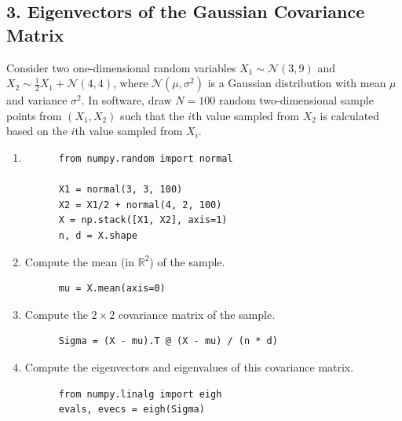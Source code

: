 \documentclass{article}
\renewcommand{\N}{\mathcal{N}}
\renewcommand{\R}{\mathbb{R}}
\begin{document}
\subsection*{3. Eigenvectors of the Gaussian Covariance Matrix}
Consider two one-dimensional random variables $X_1 \sim \N(3, 9)$ and $X_2 \sim \frac{1}{2}X_1 + \N(4, 4)$, where $\N(\mu, \sigma^2)$  is a Gaussian distribution with mean $\mu$ and variance $\sigma^2$. In software, draw $N = 100$ random two-dimensional sample points from $(X_1, X_2)$ such that the $i$th value sampled from $X_2$ is calculated based on the $i$th value sampled from $X_i$.
\begin{enumerate}[label=(\alph*)]
  \item
  \begin{mdframed}
    \begin{verbatim}
      from numpy.random import normal

      X1 = normal(3, 3, 100)
      X2 = X1/2 + normal(4, 2, 100)
      X = np.stack([X1, X2], axis=1)
      n, d = X.shape
    \end{verbatim}
  \end{mdframed}
\item Compute the mean (in $\R^2$) of the sample.
  \begin{mdframed}
    \begin{verbatim}
      mu = X.mean(axis=0)
    \end{verbatim}
  \end{mdframed}

\item Compute the $2 \times 2$ covariance matrix of the sample.
  \begin{mdframed}
    \begin{verbatim}
      Sigma = (X - mu).T @ (X - mu) / (n * d)
    \end{verbatim}
  \end{mdframed}

\item Compute the eigenvectors and eigenvalues of this covariance matrix.
  \begin{mdframed}
    \begin{verbatim}
      from numpy.linalg import eigh
      evals, evecs = eigh(Sigma)
    \end{verbatim}
  \end{mdframed}


\end{enumerate}
\end{document}
